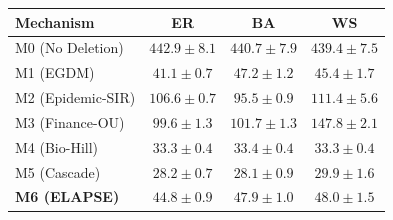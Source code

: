 \begin{tabular}{lccc}
  \toprule
  Mechanism & ER & BA & WS \\
  \midrule
  M0 (No Deletion) & $442.9 \pm 8.1$ & $440.7 \pm 7.9$ & $439.4 \pm 7.5$ \\
  M1 (EGDM) & $41.1 \pm 0.7$ & $47.2 \pm 1.2$ & $45.4 \pm 1.7$ \\
  M2 (Epidemic-SIR) & $106.6 \pm 0.7$ & $95.5 \pm 0.9$ & $111.4 \pm 5.6$ \\
  M3 (Finance-OU) & $99.6 \pm 1.3$ & $101.7 \pm 1.3$ & $147.8 \pm 2.1$ \\
  M4 (Bio-Hill) & $33.3 \pm 0.4$ & $33.4 \pm 0.4$ & $33.3 \pm 0.4$ \\
  M5 (Cascade) & $28.2 \pm 0.7$ & $28.1 \pm 0.9$ & $29.9 \pm 1.6$ \\
  \midrule
  \textbf{M6 (ELAPSE)} & \textbf{$44.8 \pm 0.9$} & \textbf{$47.9 \pm 1.0$} & \textbf{$48.0 \pm 1.5$} \\
  \bottomrule
\end{tabular}